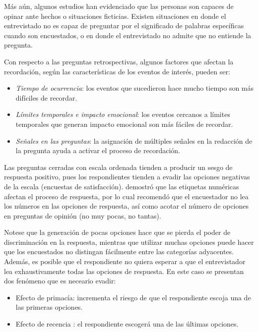 \documentclass[
  10pt,
  spanish,
]{book}
\providecommand{\tightlist}{%
  \setlength{\itemsep}{0pt}\setlength{\parskip}{0pt}}
\begin{document}
Más aún, algunos estudios han evidenciado que las personas son capaces de opinar ante hechos o situaciones ficticias. Existen situaciones en donde el entrevistado no es capaz de preguntar por el significado de palabras específicas cuando son encuestados, o en donde el entrevistado no admite que no entiende la pregunta.

Con respecto a las preguntas retrospectivas, algunos factores que afectan la recordación, según las características de los eventos de interés, pueden ser:

\begin{itemize}
\tightlist
\item
  \emph{Tiempo de ocurrencia}: los eventos que sucedieron hace mucho tiempo son más difíciles de recordar.
\item
  \emph{Límites temporales e impacto emocional}: los eventos cercanos a límites temporales que generan impacto emocional son más fáciles de recordar.
\item
  \emph{Señales en las preguntas}: la asignación de múltiples señales en la redacción de la pregunta ayuda a activar el proceso de recordación.
\end{itemize}

Las preguntas cerradas con escala ordenada tienden a producir un sesgo de respuesta positivo, pues los respondientes tienden a evadir las opciones negativas de la escala (encuestas de satisfacción). \citet{Schwarz1991} demostró que las etiquetas numéricas afectan el proceso de respuesta, por lo cual recomendó que el encuestador no lea los números en las opciones de respuesta, así como acotar el número de opciones en preguntas de opinión (no muy pocas, no tantas).

Notese que la generación de pocas opciones hace que se pierda el poder de discriminación en la respuesta, mientras que utilizar muchas opciones puede hacer que los encuestados no distingan fácilmente entre las categorías adyacentes. Además, es posible que el respondiente no quiera esperar a que el entrevistador lea exhaustivamente todas las opciones de respuesta. En este caso se presentan dos fenómeno que es neceario evadir:

\begin{itemize}
\tightlist
\item
  Efecto de primacía: incrementa el riesgo de que el respondiente escoja una de las primeras opciones.
\item
  Efecto de recencia : el respondiente escogerá una de las últimas opciones.
\end{itemize}
\end{document}
